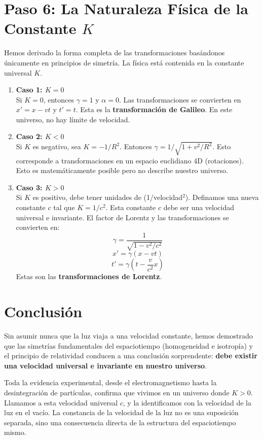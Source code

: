 \documentclass[11pt,a4paper]{book}
\begin{document}
\section{Paso 6: La Naturaleza Física de la Constante \texorpdfstring{$K$}{K}}
Hemos derivado la forma completa de las transformaciones basándonos únicamente en principios de simetría. La física está contenida en la constante universal $K$.
\begin{enumerate}
    \item \textbf{Caso 1: $K=0$} \\
    Si $K=0$, entonces $\gamma = 1$ y $\alpha=0$. Las transformaciones se convierten en $x' = x - vt$ y $t'=t$. Esta es la \textbf{transformación de Galileo}. En este universo, no hay límite de velocidad.

    \item \textbf{Caso 2: $K<0$} \\
    Si $K$ es negativo, sea $K = -1/R^2$. Entonces $\gamma = 1/\sqrt{1+v^2/R^2}$. Esto corresponde a transformaciones en un espacio euclidiano 4D (rotaciones). Esto es matemáticamente posible pero no describe nuestro universo.

    \item \textbf{Caso 3: $K>0$} \\
    Si $K$ es positivo, debe tener unidades de (1/velocidad$^2$). Definamos una nueva constante $c$ tal que $K = 1/c^2$. Esta constante $c$ debe ser una velocidad universal e invariante. El factor de Lorentz y las transformaciones se convierten en:
    \[ \gamma = \frac{1}{\sqrt{1 - v^2/c^2}} \]
    \[ x' = \gamma(x-vt) \]
    \[ t' = \gamma(t - \frac{v}{c^2}x) \]
    Estas son las \textbf{transformaciones de Lorentz}.
\end{enumerate}

\section{Conclusión}
Sin asumir nunca que la luz viaja a una velocidad constante, hemos demostrado que las simetrías fundamentales del espaciotiempo (homogeneidad e isotropía) y el principio de relatividad conducen a una conclusión sorprendente: \textbf{debe existir una velocidad universal e invariante en nuestro universo}.

Toda la evidencia experimental, desde el electromagnetismo hasta la desintegración de partículas, confirma que vivimos en un universo donde $K > 0$. Llamamos a esta velocidad universal $c$, y la identificamos con la velocidad de la luz en el vacío. La constancia de la velocidad de la luz no es una suposición separada, sino una consecuencia directa de la estructura del espaciotiempo mismo.
\end{document}
